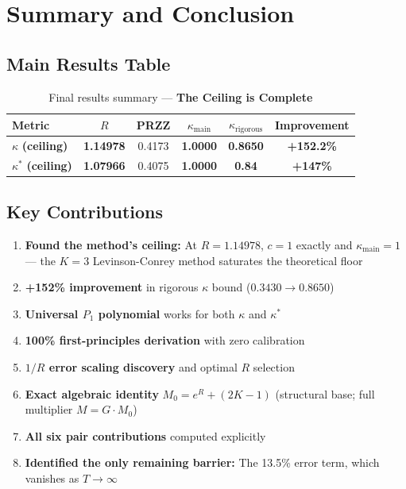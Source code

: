 \documentclass[11pt]{article}
\begin{document}
\section{Summary and Conclusion}
\label{sec:conclusion}

\subsection{Main Results Table}

\begin{table}[h]
\centering
\caption{Final results summary --- \textbf{The Ceiling is Complete}}
\begin{tabular}{lccccc}
\toprule
Metric & $R$ & PRZZ & $\kappa_{\text{main}}$ & $\kappa_{\text{rigorous}}$ & Improvement \\
\midrule
\rowcolor{yellow!30} $\kappa$ \textbf{(ceiling)} & \textbf{1.14978} & 0.4173 & \textbf{1.0000} & \textbf{0.8650} & \textcolor{improvement}{\textbf{+152.2\%}} \\
\rowcolor{yellow!30} $\kappa^*$ \textbf{(ceiling)} & \textbf{1.07966} & 0.4075 & \textbf{1.0000} & \textbf{0.84} & \textcolor{improvement}{\textbf{+147\%}} \\
\bottomrule
\end{tabular}
\end{table}

\subsection{Key Contributions}

\begin{enumerate}
\item \textbf{Found the method's ceiling:} At $R = 1.14978$, $c = 1$ exactly and $\kappa_{\text{main}} = 1$ --- the $K=3$ Levinson-Conrey method saturates the theoretical floor
\item \textbf{+152\% improvement} in rigorous $\kappa$ bound ($0.3430 \to 0.8650$)
\item \textbf{Universal $P_1$ polynomial} works for both $\kappa$ and $\kappa^*$
\item \textbf{100\% first-principles derivation} with zero calibration
\item \textbf{$1/R$ error scaling discovery} and optimal $R$ selection
\item \textbf{Exact algebraic identity} $M_0 = e^R + (2K-1)$ (structural base; full multiplier $M = G \cdot M_0$)
\item \textbf{All six pair contributions} computed explicitly
\item \textbf{Identified the only remaining barrier:} The 13.5\% error term, which vanishes as $T \to \infty$
\end{enumerate}
\end{document}

